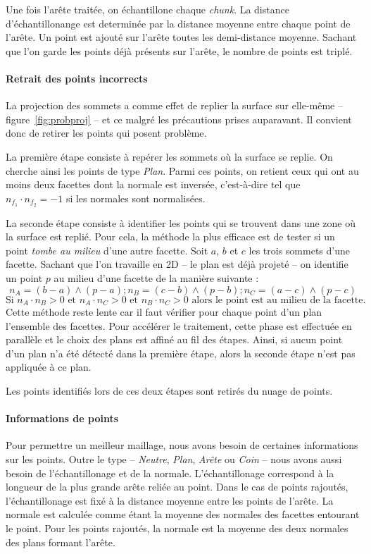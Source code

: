 \documentclass[12pt, twoside]{article}
\begin{document}
Une fois l'arête traitée, on échantillone chaque \textit{chunk}. La distance d'échantillonange est determinée par la distance moyenne entre chaque point de l'arête. Un point est ajouté sur l'arête toutes les demi-distance moyenne. Sachant que l'on garde les points déjà présents sur l'arête, le nombre de points est triplé.

\paragraph{Retrait des points incorrects} La projection des sommets a comme effet de replier la surface sur elle-même -- figure~\ref{fig:probproj} -- et ce malgré les précautions prises auparavant. Il convient donc de retirer les points qui posent problème.

La première étape consiste à repérer les sommets où la surface se replie. On cherche ainsi les points de type \textit{Plan}. Parmi ces points, on retient ceux qui ont au moins deux facettes dont la normale est inversée, c'est-à-dire tel que $n_{f_{1}} \cdot n_{f_{2}} = -1$ si les normales sont normalisées.

La seconde étape consiste à identifier les points qui se trouvent dans une zone où la surface est replié. Pour cela, la méthode la plus efficace est de tester si un point \textit{tombe au milieu} d'une autre facette. Soit $a$, $b$ et $c$ les trois sommets d'une facette. Sachant que l'on travaille en 2D -- le plan est déjà projeté -- on identifie un point $p$ au milieu d'une facette de la manière suivante :
$$n_A = (b-a)\wedge(p-a) ; n_B = (c-b)\wedge(p-b) ; n_C = (a-c)\wedge(p-c)$$
$$\text{Si }n_A\cdot n_B > 0 \text{ et } n_A\cdot n_C > 0 \text{ et } n_B\cdot n_C > 0 \text{ alors le point est au milieu de la facette.}$$
Cette méthode reste lente car il faut vérifier pour chaque point d'un plan l'ensemble des facettes. Pour accélérer le traitement, cette phase est effectuée en parallèle et le choix des plans est affiné au fil des étapes. Ainsi, si aucun point d'un plan n'a été détecté dans la première étape, alors la seconde étape n'est pas appliquée à ce plan.

Les points identifiés lors de ces deux étapes sont retirés du nuage de points.

\paragraph{Informations de points} Pour permettre un meilleur maillage, nous avons besoin de certaines informations sur les points. Outre le type -- \textit{Neutre}, \textit{Plan}, \textit{Arête} ou \textit{Coin} -- nous avons aussi besoin de l'échantillonage et de la normale. L'échantillonage correspond à la longueur de la plus grande arête reliée au point. Dans le cas de points rajoutés, l'échantillonage est fixé à la distance moyenne entre les points de l'arête. La normale est calculée comme étant la moyenne des normales des facettes entourant le point. Pour les points rajoutés, la normale est la moyenne des deux normales des plans formant l'arête.\newline
\end{document}
